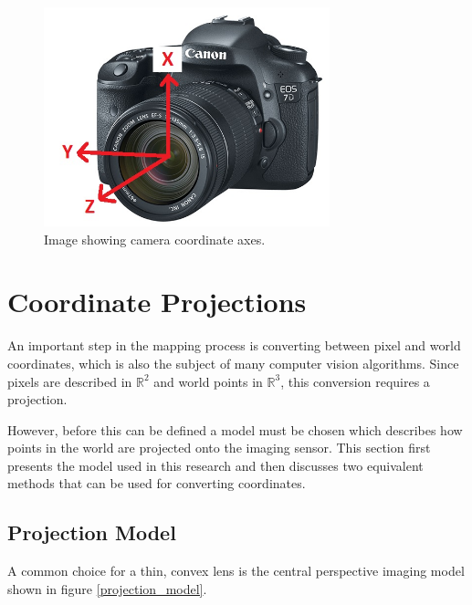 \begin{figure}[tbh]
	\centering
    \includegraphics[height=2.5in]{figures/camera_frame_canon.jpg}
    \caption[Camera coordinate frame]{Image showing camera coordinate axes.}
    \label{platform_frame}
\end{figure}

\section{Coordinate Projections}
 
 An important step in the mapping process is converting between pixel and world coordinates, which is also the subject of many computer vision algorithms.  Since pixels are described in $\mathbb{R}^2$ and world points in $\mathbb{R}^3$, this conversion requires a projection.  
 
 However, before this can be defined a model must be chosen which describes how points in the world are projected onto the imaging sensor.  This section first presents the model used in this research and then discusses two equivalent methods that can be used for converting coordinates.  
 
 \subsection{Projection Model}
 
 A common choice for a thin, convex lens is the central perspective imaging model shown in figure \ref{projection_model}.
 
